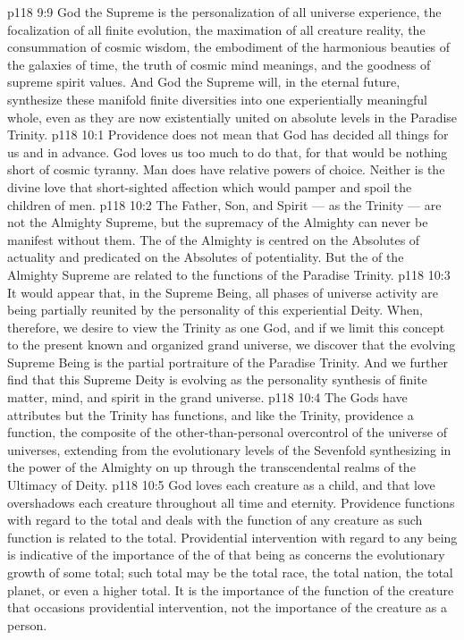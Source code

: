 \vs p118 9:9 \pc God the Supreme is the personalization of all universe experience, the focalization of all finite evolution, the maximation of all creature reality, the consummation of cosmic wisdom, the embodiment of the harmonious beauties of the galaxies of time, the truth of cosmic mind meanings, and the goodness of supreme spirit values. And God the Supreme will, in the eternal future, synthesize these manifold finite diversities into one experientially meaningful whole, even as they are now existentially united on absolute levels in the Paradise Trinity.
\vs p118 10:1 Providence does not mean that God has decided all things for us and in advance. God loves us too much to do that, for that would be nothing short of cosmic tyranny. Man does have relative powers of choice. Neither is the divine love that short\hyp{}sighted affection which would pamper and spoil the children of men.
\vs p118 10:2 \pc The Father, Son, and Spirit --- as the Trinity --- are not the Almighty Supreme, but the supremacy of the Almighty can never be manifest without them. The  of the Almighty is centred on the Absolutes of actuality and predicated on the Absolutes of potentiality. But the  of the Almighty Supreme are related to the functions of the Paradise Trinity.
\vs p118 10:3 It would appear that, in the Supreme Being, all phases of universe activity are being partially reunited by the personality of this experiential Deity. When, therefore, we desire to view the Trinity as one God, and if we limit this concept to the present known and organized grand universe, we discover that the evolving Supreme Being is the partial portraiture of the Paradise Trinity. And we further find that this Supreme Deity is evolving as the personality synthesis of finite matter, mind, and spirit in the grand universe.
\vs p118 10:4 The Gods have attributes but the Trinity has functions, and like the Trinity, providence  a function, the composite of the other\hyp{}than\hyp{}personal overcontrol of the universe of universes, extending from the evolutionary levels of the Sevenfold synthesizing in the power of the Almighty on up through the transcendental realms of the Ultimacy of Deity.
\vs p118 10:5 \pc God loves each creature as a child, and that love overshadows each creature throughout all time and eternity. Providence functions with regard to the total and deals with the function of any creature as such function is related to the total. Providential intervention with regard to any being is indicative of the importance of the  of that being as concerns the evolutionary growth of some total; such total may be the total race, the total nation, the total planet, or even a higher total. It is the importance of the function of the creature that occasions providential intervention, not the importance of the creature as a person.
